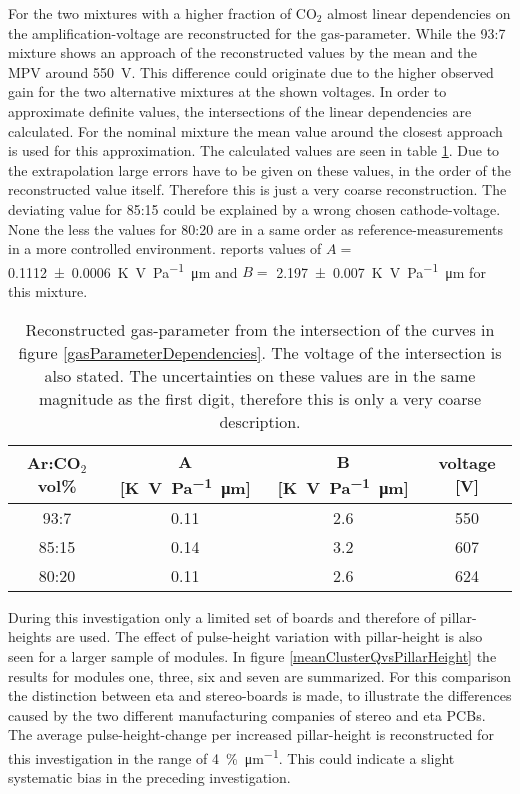 \documentclass[
twoside,            %
BCOR1.4cm,          %
10pt,               %
headings=normal,    %
headsepline,        %
clearplainpage,		%
final,              %
div=14,
open=right,
bibliography=toc
]{scrreprt}
\begin{document}
For the two mixtures with a higher fraction of CO$_2$ almost linear dependencies on the amplification-voltage are reconstructed for the gas-parameter.
While the 93:7 mixture shows an approach of the reconstructed values by the mean and the MPV around \SI{550}{V}.
This difference could originate due to the higher observed gain for the two alternative mixtures at the shown voltages.
In order to approximate definite values, the intersections of the linear dependencies are calculated.
For the nominal mixture the mean value around the closest approach is used for this approximation.
The calculated values are seen in table \ref{gasParameterReconstruction}.
Due to the extrapolation large errors have to be given on these values, in the order of the reconstructed value itself.
Therefore this is just a very coarse reconstruction.
The deviating value for 85:15 could be explained by a wrong chosen cathode-voltage.
None the less the values for 80:20 are in a same order as reference-measurements in a more controlled environment.
\cite{lippertThesis} reports values of $A = $ \SI{0.1112(6)}{\K\V\per\Pa\micro\m} and $B = $ \SI{2.197(7)}{\K\V\per\Pa\micro\m} for this mixture.

\begin{table}[!h]
	\centering	
	\begin{tabular}{cccc}
		\hline
		\hline
		\vspace{0.5mm}
		Ar:CO$_{2}$ vol\% & A [\si{\K\V\per\Pa\micro\m}] & B [\si{\K\V\per\Pa\micro\m}] & voltage [V]
		\\
		\hline
		93:7  & 0.11 & 2.6 & 550
		\\
		85:15 & 0.14 & 3.2 & 607
		\\
		80:20 & 0.11 & 2.6 & 624
		\\
		\hline
		\hline
	\end{tabular}
	\caption{
		Reconstructed gas-parameter from the intersection of the curves in figure \ref{gasParameterDependencies}.
		The voltage of the intersection is also stated.
		The uncertainties on these values are in the same magnitude as the first digit, therefore this is only a very coarse description.
	}
	\label{gasParameterReconstruction} 
\end{table}

During this investigation only a limited set of boards and therefore of pillar-heights are used.
The effect of pulse-height variation with pillar-height is also seen for a larger sample of modules.
In figure \ref{meanClusterQvsPillarHeight} the results for modules one, three, six and seven are summarized.
For this comparison the distinction between eta and stereo-boards is made, to illustrate the differences caused by the two different manufacturing companies of stereo and eta PCBs.
The average pulse-height-change per increased pillar-height is reconstructed for this investigation in the range of \SI{4}{\%\per\micro\m}.
This could indicate a slight systematic bias in the preceding investigation.
\end{document}
